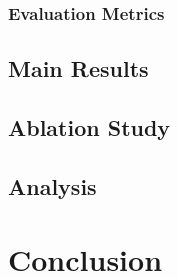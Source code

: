\documentclass[anonymous,submit,techtabs]{acl}
\begin{document}
\subsubsection{Evaluation Metrics}

\subsection{Main Results}

\subsection{Ablation Study}

\subsection{Analysis}

\section{Conclusion}



\end{document}
